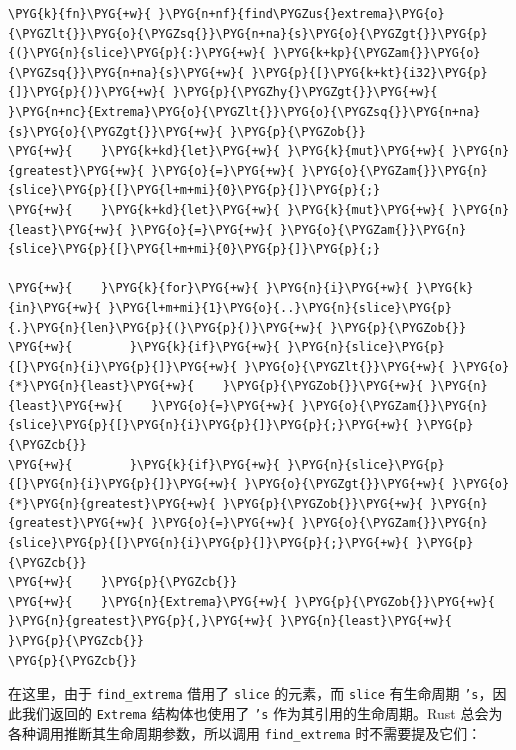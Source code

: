 \begin{Verbatim}[commandchars=\\\{\},breaklines=true,breakanywhere=true,fontsize=\codefont,xleftmargin=17bp]
\PYG{k}{fn}\PYG{+w}{ }\PYG{n+nf}{find\PYGZus{}extrema}\PYG{o}{\PYGZlt{}}\PYG{o}{\PYGZsq{}}\PYG{n+na}{s}\PYG{o}{\PYGZgt{}}\PYG{p}{(}\PYG{n}{slice}\PYG{p}{:}\PYG{+w}{ }\PYG{k+kp}{\PYGZam{}}\PYG{o}{\PYGZsq{}}\PYG{n+na}{s}\PYG{+w}{ }\PYG{p}{[}\PYG{k+kt}{i32}\PYG{p}{]}\PYG{p}{)}\PYG{+w}{ }\PYG{p}{\PYGZhy{}\PYGZgt{}}\PYG{+w}{ }\PYG{n+nc}{Extrema}\PYG{o}{\PYGZlt{}}\PYG{o}{\PYGZsq{}}\PYG{n+na}{s}\PYG{o}{\PYGZgt{}}\PYG{+w}{ }\PYG{p}{\PYGZob{}}
\PYG{+w}{    }\PYG{k+kd}{let}\PYG{+w}{ }\PYG{k}{mut}\PYG{+w}{ }\PYG{n}{greatest}\PYG{+w}{ }\PYG{o}{=}\PYG{+w}{ }\PYG{o}{\PYGZam{}}\PYG{n}{slice}\PYG{p}{[}\PYG{l+m+mi}{0}\PYG{p}{]}\PYG{p}{;}
\PYG{+w}{    }\PYG{k+kd}{let}\PYG{+w}{ }\PYG{k}{mut}\PYG{+w}{ }\PYG{n}{least}\PYG{+w}{ }\PYG{o}{=}\PYG{+w}{ }\PYG{o}{\PYGZam{}}\PYG{n}{slice}\PYG{p}{[}\PYG{l+m+mi}{0}\PYG{p}{]}\PYG{p}{;}

\PYG{+w}{    }\PYG{k}{for}\PYG{+w}{ }\PYG{n}{i}\PYG{+w}{ }\PYG{k}{in}\PYG{+w}{ }\PYG{l+m+mi}{1}\PYG{o}{..}\PYG{n}{slice}\PYG{p}{.}\PYG{n}{len}\PYG{p}{(}\PYG{p}{)}\PYG{+w}{ }\PYG{p}{\PYGZob{}}
\PYG{+w}{        }\PYG{k}{if}\PYG{+w}{ }\PYG{n}{slice}\PYG{p}{[}\PYG{n}{i}\PYG{p}{]}\PYG{+w}{ }\PYG{o}{\PYGZlt{}}\PYG{+w}{ }\PYG{o}{*}\PYG{n}{least}\PYG{+w}{    }\PYG{p}{\PYGZob{}}\PYG{+w}{ }\PYG{n}{least}\PYG{+w}{    }\PYG{o}{=}\PYG{+w}{ }\PYG{o}{\PYGZam{}}\PYG{n}{slice}\PYG{p}{[}\PYG{n}{i}\PYG{p}{]}\PYG{p}{;}\PYG{+w}{ }\PYG{p}{\PYGZcb{}}
\PYG{+w}{        }\PYG{k}{if}\PYG{+w}{ }\PYG{n}{slice}\PYG{p}{[}\PYG{n}{i}\PYG{p}{]}\PYG{+w}{ }\PYG{o}{\PYGZgt{}}\PYG{+w}{ }\PYG{o}{*}\PYG{n}{greatest}\PYG{+w}{ }\PYG{p}{\PYGZob{}}\PYG{+w}{ }\PYG{n}{greatest}\PYG{+w}{ }\PYG{o}{=}\PYG{+w}{ }\PYG{o}{\PYGZam{}}\PYG{n}{slice}\PYG{p}{[}\PYG{n}{i}\PYG{p}{]}\PYG{p}{;}\PYG{+w}{ }\PYG{p}{\PYGZcb{}}
\PYG{+w}{    }\PYG{p}{\PYGZcb{}}
\PYG{+w}{    }\PYG{n}{Extrema}\PYG{+w}{ }\PYG{p}{\PYGZob{}}\PYG{+w}{ }\PYG{n}{greatest}\PYG{p}{,}\PYG{+w}{ }\PYG{n}{least}\PYG{+w}{ }\PYG{p}{\PYGZcb{}}
\PYG{p}{\PYGZcb{}}
\end{Verbatim}

在这里，由于 \texttt{find\_extrema} 借用了 \texttt{slice} 的元素，而 \texttt{slice} 有生命周期 \texttt{'s}，因此我们返回的 \texttt{Extrema} 结构体也使用了 \texttt{'s} 作为其引用的生命周期。Rust 总会为各种调用推断其生命周期参数，所以调用 \texttt{find\_extrema} 时不需要提及它们：

